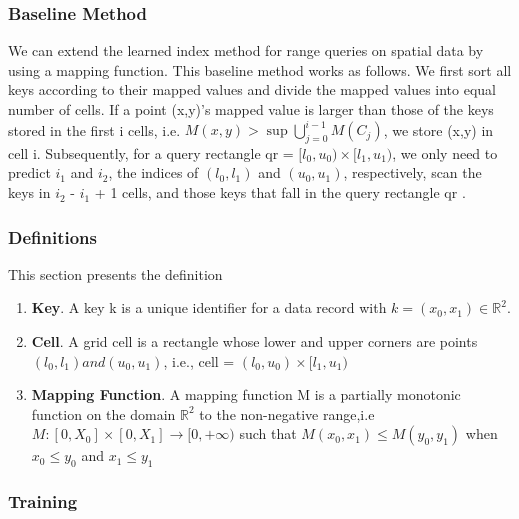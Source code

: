 \subsubsection{Baseline Method}  

We can extend the learned index method for range queries on spatial data by using a mapping function. This baseline method works as follows. We first sort all keys according to their mapped values and divide the mapped values into equal number of cells. If a point
(x,y)’s mapped value is larger than those of the keys stored
in the first i cells, i.e. $M(x,y) > \sup \bigcup\limits_{j=0}^{i-1} M(C_{j})$, we store (x,y) in cell i. Subsequently, for a query rectangle
qr = $[l_{0},u_{0}) \times [l_{1},u_{1})$, we only need to predict $i_{1}$ and $i_{2}$, the indices of $(l_{0}, l_{1})$ and $(u_{0},u_{1})$, respectively, scan the keys in $i_{2}$ - $i_{1}$ + 1 cells, and those keys that fall in the query rectangle qr . 

\subsubsection{Definitions}

This section presents the definition

\begin{enumerate}
	\item \textbf{Key}. A key k is a unique identifier for a data record with $k = (x_{0}, x_{1}) \in \mathbb{R}^{2}$. 
    
	\item \textbf{Cell}. A grid cell is a rectangle whose lower and upper corners are points $(l_{0},l_{1}) and  (u_{0},u_{1})$, i.e.,  cell = $(l_{0},u_{0}) \times [l_{1},u_{1})$
	
	\item \textbf{Mapping Function}. A mapping function M is a partially monotonic function on the domain $\mathbb{R}^{2}$ to the non-negative range,i.e $M:[0,X_{0}]\times[0,X_{1}]\to [0,+\infty)$ such that $M(x_{0},x_{1}) \leq M(y_{0},y_{1})$ when $x_{0} \leq y_{0}$ and $x_{1} \leq y_{1} $
    
\end{enumerate}


\subsubsection{Training}

